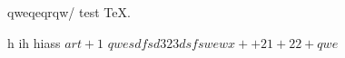 \documentclass{article}
\begin{document}
qweqeqrqw/ test \TeX. 

h ih  hiass $art + 1 $
$qwe sdfsd 323dsfs wew x+ +21 +22 +
qwe$
\end{document}
